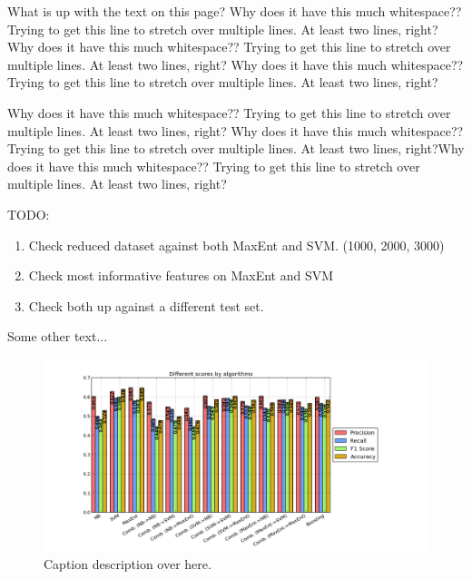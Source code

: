 What is up with the text on this page? Why does it have this much whitespace?? Trying to get this line to stretch over multiple lines. At least two lines, right? Why does it have this much whitespace?? Trying to get this line to stretch over multiple lines. At least two lines, right? Why does it have this much whitespace?? Trying to get this line to stretch over multiple lines. At least two lines, right?

Why does it have this much whitespace?? Trying to get this line to stretch over multiple lines. At least two lines, right? Why does it have this much whitespace?? Trying to get this line to stretch over multiple lines. At least two lines, right?Why does it have this much whitespace?? Trying to get this line to stretch over multiple lines. At least two lines, right?

TODO:
\begin{enumerate}
	\item Check reduced dataset against both MaxEnt and SVM. (1000, 2000, 3000)
	\item Check most informative features on MaxEnt and SVM
	\item Check both up against a different test set. 
\end{enumerate}

Some other text...


\begin{figure}
 \begin{center}
     \includegraphics[width=\linewidth]{../img/plots/grid/full.png}
 \end{center}
 \caption[Results overview across models]{Caption description over here.}
 \label{fig:results_full}
\end{figure}



